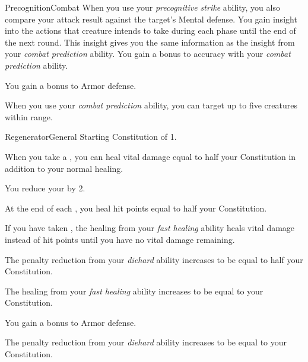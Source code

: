 \begin{feat}{Precognition}{Combat}
         When you use your \textit{precognitive strike} ability, you also compare your attack result against the target's Mental defense.
        \hit You gain insight into the actions that creature intends to take during each phase until the end of the next round.
        This insight gives you the same information as the insight from your \textit{combat prediction} ability.
        You gain a  bonus to accuracy with your \textit{combat prediction} ability.

         You gain a  bonus to Armor defense.

         When you use your \textit{combat prediction} ability, you can target up to five creatures within range.
    \end{feat}

    \begin{feat}{Regenerator}{General}
        \featpre Starting Constitution of 1.

         When you take a , you can heal vital damage equal to half your Constitution in addition to your normal healing.

         You reduce your  by 2.

         At the end of each , you heal hit points equal to half your Constitution.

         If you have taken , the healing from your \textit{fast healing} ability heals vital damage instead of hit points until you have no vital damage remaining.

         The penalty reduction from your \textit{diehard} ability increases to be equal to half your Constitution.

         The healing from your \textit{fast healing} ability increases to be equal to your Constitution.

         You gain a  bonus to Armor defense.

         The penalty reduction from your \textit{diehard} ability increases to be equal to your Constitution.
    \end{feat}

